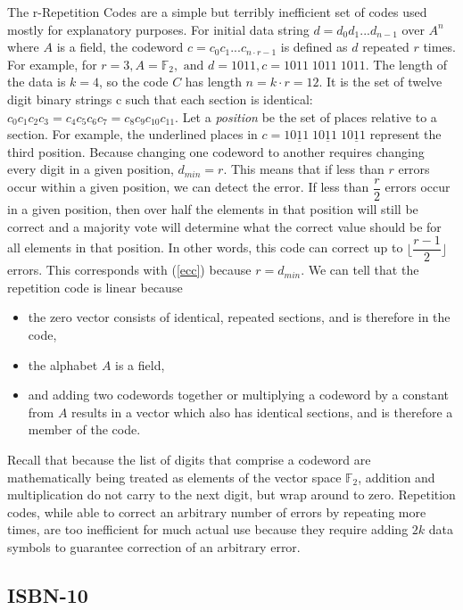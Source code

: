 \documentclass[11pt]{article}
\newcommand{\F}{\mathbb{F}}
\begin{document}
The r-Repetition Codes are a simple but terribly inefficient set of codes used mostly for explanatory purposes. For initial data string $d=d_{0}d_{1}...d_{n-1}$ over $A^{n}$ where $A$ is a field, the codeword $c=c_{0}c_{1}...c_{n\cdot r-1}$ is defined as $d$ repeated $r$ times. For example, for $r=3, A=\F_{2},\text{ and }d=1011, c=1011\; 1011\; 1011$. The length of the data is $k=4$, so the code $C$ has length $n=k\cdot r=12$. It is the set of twelve digit binary strings c such that each section is identical: $c_{0}c_{1}c_{2}c_{3}=c_{4}c_{5}c_{6}c_{7}=c_{8}c_{9}c_{10}c_{11}$. Let a \textit{position} be the set of places relative to a section. For example, the underlined places in $c=10\underline{1}1\; 10\underline{1}1\; 10\underline{1}1$ represent the third position. Because changing one codeword to another requires changing every digit in a given position, $d_{min}=r$. This means that if less than $r$ errors occur within a given position, we can detect the error. If less than $\dfrac{r}{2}$ errors occur in a given position, then over half the elements in that position will still be correct and a majority vote will determine what the correct value should be for all elements in that position. In other words, this code can correct up to $\lfloor\dfrac{r-1}{2}\rfloor$ errors. This corresponds with (\ref{ecc}) because $r=d_{min}$. We can tell that the repetition code is linear because
\begin{itemize}
\item {the zero vector consists of identical, repeated sections, and is therefore in the code,}
\item {the alphabet $A$ is a field,}
\item {and adding two codewords together or multiplying a codeword by a constant from $A$ results in a vector which also has identical sections, and is therefore a member of the code.}
\end{itemize}
Recall that because the list of digits that comprise a codeword are mathematically being treated as elements of the vector space $\F_{2}$, addition and multiplication do not carry to the next digit, but wrap around to zero. Repetition codes, while able to correct an arbitrary number of errors by repeating more times, are too inefficient for much actual use because they require adding $2k$ data symbols to guarantee correction of an arbitrary error. \cite[2]{codesandcurves}

\subsection{ISBN-10}
\end{document}
